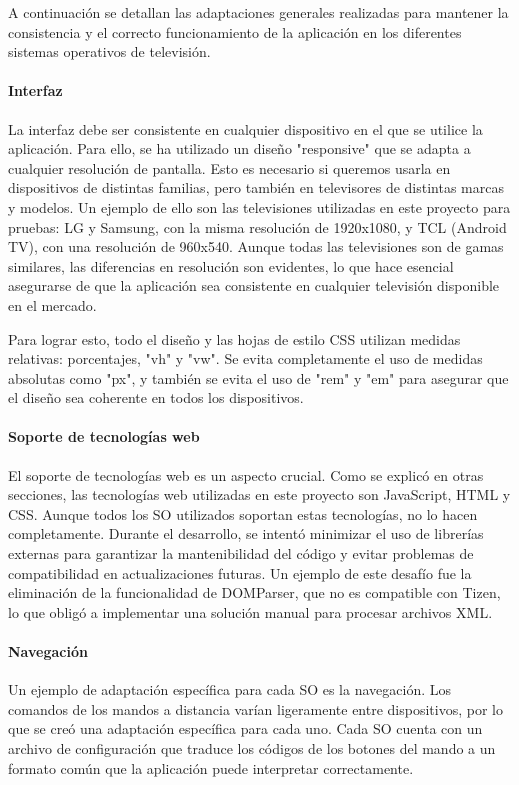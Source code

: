 A continuación se detallan las adaptaciones generales realizadas para mantener la consistencia y el correcto
funcionamiento de la aplicación en los diferentes sistemas operativos de televisión.

\paragraph{Interfaz}
La interfaz debe ser consistente en cualquier dispositivo en el que se utilice la aplicación. Para ello, se ha 
utilizado un diseño "responsive" que se adapta a cualquier resolución de pantalla. Esto es necesario si queremos usarla 
en dispositivos de distintas familias, pero también en televisores de distintas marcas y modelos. Un ejemplo de ello son 
las televisiones utilizadas en este proyecto para pruebas: LG y Samsung, con la misma resolución de 1920x1080, y TCL (Android TV), 
con una resolución de 960x540. Aunque todas las televisiones son de gamas similares, las diferencias en resolución son evidentes, 
lo que hace esencial asegurarse de que la aplicación sea consistente en cualquier televisión disponible en el mercado. 

Para lograr esto, todo el diseño y las hojas de estilo CSS utilizan medidas relativas: porcentajes, "vh" y "vw". 
Se evita completamente el uso de medidas absolutas como "px", y también se evita el uso de "rem" y "em" para asegurar que 
el diseño sea coherente en todos los dispositivos.

\paragraph{Soporte de tecnologías web}
El soporte de tecnologías web es un aspecto crucial. Como se explicó en otras secciones, las tecnologías web utilizadas en 
este proyecto son JavaScript, HTML y CSS. Aunque todos los SO utilizados soportan estas tecnologías, no lo hacen completamente. 
Durante el desarrollo, se intentó minimizar el uso de librerías externas para garantizar la mantenibilidad del código y evitar 
problemas de compatibilidad en actualizaciones futuras. Un ejemplo de este desafío fue la eliminación de la funcionalidad 
de DOMParser, que no es compatible con Tizen, lo que obligó a implementar una solución manual para procesar archivos XML.

\paragraph{Navegación}
Un ejemplo de adaptación específica para cada SO es la navegación. Los comandos de los mandos a distancia varían ligeramente 
entre dispositivos, por lo que se creó una adaptación específica para cada uno. Cada SO cuenta con un archivo de configuración 
que traduce los códigos de los botones del mando a un formato común que la aplicación puede interpretar correctamente.

